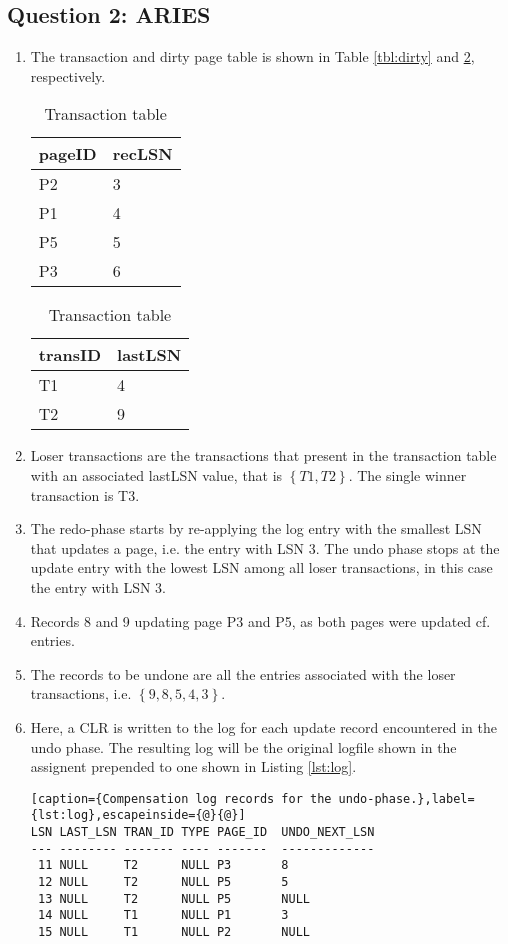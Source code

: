 \documentclass[11pt,a4paper,english]{article}
\begin{document}
\subsection*{Question 2: ARIES}
\begin{enumerate}
\item The transaction and dirty page table is shown in Table \ref{tbl:dirty} and \ref{tbl:transaction}, respectively.
\begin{table}[!hbt]
\parbox{.45\linewidth}{
\centering
\begin{tabular}{|l|l|}
\hline
pageID  & recLSN  \\ \hline
P2      & 3       \\ \hline
P1      & 4       \\ \hline
P5      & 5       \\ \hline
P3      & 6       \\ \hline
\end{tabular}
\caption{Dirty page table}
\label{tbl:dirty}
}
\hfill
\parbox{.45\linewidth}{
\centering
\begin{tabular}{|l|l|}
\hline
transID & lastLSN \\ \hline
T1      & 4       \\ \hline
T2      & 9       \\
\hline
\end{tabular}
\caption{Transaction table}
\label{tbl:transaction}
}
\end{table}

\item Loser transactions are the transactions that present in the transaction table with an associated lastLSN value, that is $\left\{ T1, T2 \right\}$. The single winner transaction is T3.

\item The redo-phase starts by re-applying the log entry with the smallest LSN that updates a page, i.e. the entry with LSN 3. The undo phase stops at the update entry with the lowest LSN among all loser transactions, in this case the entry with LSN 3.

\item Records 8 and 9 updating page P3 and P5, as both pages were updated cf. entries.

\item The records to be undone are all the entries associated with the loser transactions, i.e. $\left\{9, 8, 5, 4, 3\right\}$.

\item Here, a CLR is written to the log for each update record encountered in the undo phase. The resulting log will be the original logfile shown in the assignent prepended to one shown in Listing \ref{lst:log}.
\\
\begin{lstlisting}[caption={Compensation log records for the undo-phase.},label={lst:log},escapeinside={@}{@}]
LSN LAST_LSN TRAN_ID TYPE PAGE_ID  UNDO_NEXT_LSN
--- -------- ------- ---- -------  -------------
 11 NULL     T2      NULL P3       8
 12 NULL     T2      NULL P5       5
 13 NULL     T2      NULL P5       NULL
 14 NULL     T1      NULL P1       3
 15 NULL     T1      NULL P2       NULL
\end{lstlisting}


\end{enumerate}
\end{document}
